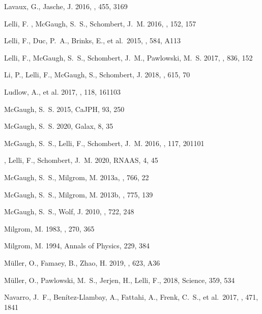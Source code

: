 \documentclass[twocolumn,tighten]{aastex63}
\begin{document}
\begin{thebibliography}{}
 {{Lavaux}, G.}, {{Jasche}, J.} 2016, {\mnras}, {455}, {3169}  

 {{Lelli}, F.} , {{McGaugh}, S.~S.}, {{Schombert}, J.~M.} 2016, {\aj}, {152}, {157}

 {{Lelli}, F.}, {{Duc}, P.~A.}, {{Brinks}, E.}, et al.\ 2015, {\aap}, {584}, {A113}

 {{Lelli}, F.}, {{McGaugh}, S.~S.}, {{Schombert}, J.~M.}, {{Pawlowski}, M.~S.} 2017, {\apj}, {836}, {152}

 Li, P., Lelli, F., McGaugh, S., Schombert, J. 2018, \aap, 615, 70  

 {{Ludlow}, A.}, {et al.} 2017, {\prl}, {118}, {161103}
  
 {{McGaugh}, S.~S.} 2015, {CaJPH}, {93}, {250}

 {{McGaugh}, S.~S.} 2020, {Galax}, {8}, {35}
    
 {{McGaugh}, S.~S.}, {{Lelli}, F.}, {{Schombert}, J.~M.} 2016, {\prl}, {117}, {201101}

, {{Lelli}, F.}, {{Schombert}, J.~M.} 2020, {RNAAS}, {4}, {45}

 {{McGaugh}, S.~S.}, {{Milgrom}, M.} 2013a, {\apj}, {766}, {22}
  
 {{McGaugh}, S.~S.}, {{Milgrom}, M.} 2013b, {\apj}, {775}, {139}

 {{McGaugh}, S.~S.}, {{Wolf}, J.} 2010, {\apj}, {722}, {248}  
  
 {{Milgrom}, M.} 1983, {\apj}, {270}, 365

 {{Milgrom}, M.} 1994, {Annals of Physics}, {229}, {384}

 {{M\"{u}ller}, O.}, {{Famaey}, B.}, {{Zhao}, H.} 2019, {\aap}, {623}, {A36}

 {{M\"{u}ller}, O.}, {{Pawlowski}, M.~S.}, {{Jerjen}, H.}, {{Lelli}, F.}, 2018, {Science}, {359}, {534}  
  
 {{Navarro}, J.~F.}, {{Ben\'{i}tez-Llambay}, A.}, {{Fattahi}, A.}, {{Frenk}, C.~S.}, et al.\ {2017}, {\mnras}, {471}, {1841}


\end{thebibliography}
\end{document}
